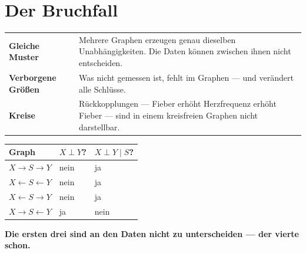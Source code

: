 \section{Der Bruchfall}

\begin{warnung}
\begin{center}
{\small
\renewcommand{\arraystretch}{1.52}
\begin{tabular}{@{}P{2.8cm}P{5.8cm}@{}}
\toprule
\textbf{Gleiche Muster} & Mehrere Graphen erzeugen genau dieselben Unabhängigkeiten. Die Daten können zwischen ihnen nicht entscheiden.\\
\textbf{Verborgene Größen} & Was nicht gemessen ist, fehlt im Graphen --- und verändert alle Schlüsse.\\
\textbf{Kreise} & Rückkopplungen --- Fieber erhöht Herzfrequenz erhöht Fieber --- sind in einem kreisfreien Graphen nicht darstellbar.\\
\bottomrule
\end{tabular}}
\end{center}

\begin{center}
{\small
\renewcommand{\arraystretch}{1.5}
\begin{tabular}{@{}P{3.0cm}P{2.6cm}P{2.6cm}@{}}
\toprule
\textbf{Graph} & $X \perp Y$? & $X \perp Y \mid S$?\\
\midrule
$X \to S \to Y$ & nein & \textcolor{gruen}{ja}\\
$X \leftarrow S \leftarrow Y$ & nein & \textcolor{gruen}{ja}\\
$X \leftarrow S \to Y$ & nein & \textcolor{gruen}{ja}\\
\midrule
$X \to S \leftarrow Y$ & \textcolor{gruen}{ja} & nein\\
\bottomrule
\end{tabular}}
\end{center}

\begin{center}
\begin{minipage}{0.9\textwidth}
\textbf{Die ersten drei sind an den Daten nicht zu unterscheiden --- der vierte schon.}
\end{minipage}
\end{center}

\begin{center}
\begin{minipage}{0.88\textwidth}
\end{minipage}
\end{center}


\end{warnung}

